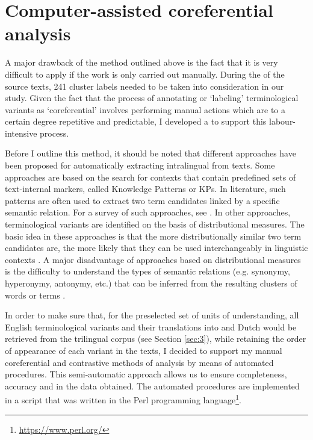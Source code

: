 \documentclass[output=paper]{langsci/langscibook.cls}
\begin{document}
\section{Computer-assisted coreferential analysis}\label{sec:4}

A major drawback of the method outlined above is the fact that it is very difficult 
to apply if the work is only carried out manually. During the  
of the source texts, 241 cluster labels needed to be taken into consideration in 
our study. Given the fact that the process of annotating or `labeling' terminological 
variants as `coreferential' involves performing manual actions which are to a certain 
degree repetitive and predictable, I developed a  to support 
this labour-intensive process. 

Before I outline this method, it should be noted that different approaches have 
been proposed for automatically extracting intralingual  
from texts. Some approaches are based on the search for contexts that contain predefined 
sets of text-internal markers, called Knowledge Patterns or KPs. In literature, 
such patterns are often used to extract two term candidates linked by a specific 
semantic relation. For a survey of such approaches, see \citet{AugerBarriere2008}. 
In other approaches, terminological variants are identified on the basis of distributional 
measures. The basic idea in these approaches is that the more distributionally similar two term candidates are, the more likely that they can be used interchangeably 
in linguistic contexts \citep{WeedsMarcu2005,RychlyKilgariff2007,ShimizuEtAL2008,KazamaEtAl2010}. A major disadvantage of approaches based on distributional measures is the difficulty to understand the types of semantic relations (e.g. 
synonymy, hyperonymy, antonymy, etc.) that can be inferred from the resulting clusters 
of words or terms \citep{BudanitskyHirst2006,HeylenEtAl2008,PeirsmanEtAL2008}.

In order to make sure that, for the preselected set of units of understanding, 
all English terminological variants and their translations into  and Dutch 
would be retrieved from the trilingual corpus (see Section \ref{sec:3}), while retaining 
the order of appearance of each variant in the texts, I decided to support my
manual coreferential and contrastive methods of analysis by means of automated 
procedures. This semi-automatic approach allows us to ensure completeness, accuracy 
and  in the data obtained. The automated procedures are implemented 
in a script that was written in the Perl programming language\footnote{ \url{https://www.perl.org/}}. 
\end{document}
